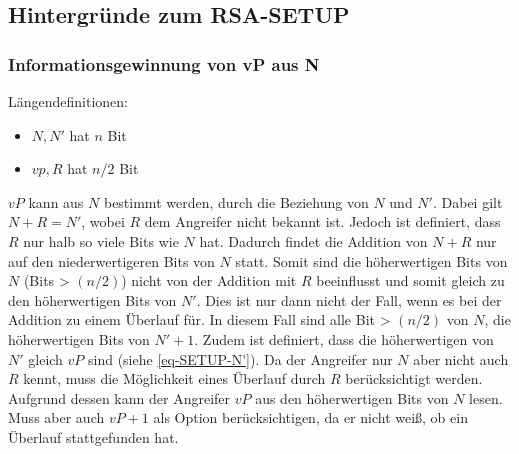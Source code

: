         \subsection{Hintergründe zum RSA-SETUP}
            \subsubsection{Informationsgewinnung von vP aus N} \label{sec-SETUP-vP_from_N}
            Längendefinitionen:
            \begin{itemize}
                \item $N, N'$ hat $n$ Bit
                \item $vp, R$ hat $n/2$ Bit
            \end{itemize}
            $vP$ kann aus $N$ bestimmt werden, durch die Beziehung von $N$ und $N'$. Dabei gilt $N + R = N'$, wobei $R$ dem Angreifer nicht bekannt ist. Jedoch ist definiert, dass $R$ nur halb so viele Bits wie $N$ hat. Dadurch findet die Addition von $N + R$ nur auf den niederwertigeren Bits von $N$ statt. Somit sind die höherwertigen Bits von $N$ (Bits > $(n/2)$) nicht von der Addition mit $R$ beeinflusst und somit gleich zu den höherwertigen Bits von $N'$. Dies ist nur dann nicht der Fall, wenn es bei der Addition zu einem Überlauf für. In diesem Fall sind alle Bit > $(n/2)$ von $N$, die höherwertigen Bits von $N' + 1$.
            Zudem ist definiert, dass die höherwertigen von $N'$ gleich $vP$ sind (siehe \ref{eq-SETUP-N'}).
            Da der Angreifer nur $N$ aber nicht auch $R$ kennt, muss die Möglichkeit eines Überlauf durch $R$ berücksichtigt werden. 
            Aufgrund dessen kann der Angreifer $vP$ aus den höherwertigen Bits von $N$ lesen. Muss aber auch $vP + 1$ als Option berücksichtigen, da er nicht weiß, ob ein Überlauf stattgefunden hat.               
 
